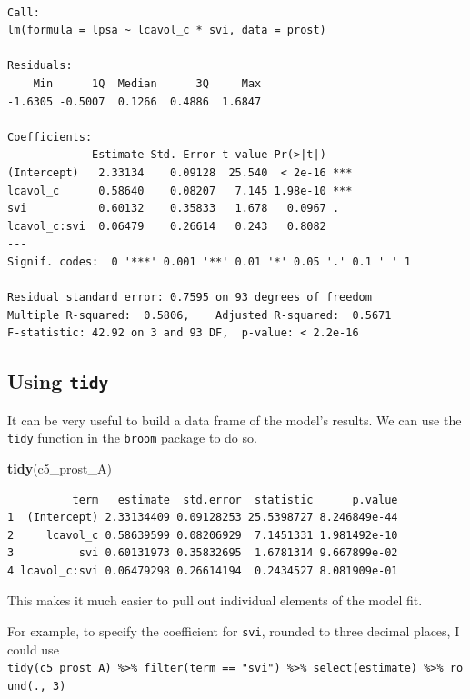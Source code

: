 \documentclass[]{book}
\newenvironment{Shaded}{\begin{snugshade}}{\end{snugshade}}
\newcommand{\KeywordTok}[1]{\textcolor[rgb]{0.13,0.29,0.53}{\textbf{#1}}}
\newcommand{\NormalTok}[1]{#1}
\theoremstyle{definition}
\theoremstyle{definition}
\theoremstyle{definition}
\theoremstyle{remark}
\begin{document}
\begin{verbatim}

Call:
lm(formula = lpsa ~ lcavol_c * svi, data = prost)

Residuals:
    Min      1Q  Median      3Q     Max 
-1.6305 -0.5007  0.1266  0.4886  1.6847 

Coefficients:
             Estimate Std. Error t value Pr(>|t|)    
(Intercept)   2.33134    0.09128  25.540  < 2e-16 ***
lcavol_c      0.58640    0.08207   7.145 1.98e-10 ***
svi           0.60132    0.35833   1.678   0.0967 .  
lcavol_c:svi  0.06479    0.26614   0.243   0.8082    
---
Signif. codes:  0 '***' 0.001 '**' 0.01 '*' 0.05 '.' 0.1 ' ' 1

Residual standard error: 0.7595 on 93 degrees of freedom
Multiple R-squared:  0.5806,    Adjusted R-squared:  0.5671 
F-statistic: 42.92 on 3 and 93 DF,  p-value: < 2.2e-16
\end{verbatim}

\subsection{\texorpdfstring{Using
\texttt{tidy}}{Using tidy}}\label{using-tidy}

It can be very useful to build a data frame of the model's results. We
can use the \texttt{tidy} function in the \texttt{broom} package to do
so.

\begin{Shaded}
\begin{Highlighting}[]
\KeywordTok{tidy}\NormalTok{(c5_prost_A)}
\end{Highlighting}
\end{Shaded}

\begin{verbatim}
          term   estimate  std.error  statistic      p.value
1  (Intercept) 2.33134409 0.09128253 25.5398727 8.246849e-44
2     lcavol_c 0.58639599 0.08206929  7.1451331 1.981492e-10
3          svi 0.60131973 0.35832695  1.6781314 9.667899e-02
4 lcavol_c:svi 0.06479298 0.26614194  0.2434527 8.081909e-01
\end{verbatim}

This makes it much easier to pull out individual elements of the model
fit.

For example, to specify the coefficient for \texttt{svi}, rounded to
three decimal places, I could use
\texttt{tidy(c5\_prost\_A)\ \%\textgreater{}\%\ filter(term\ ==\ "svi")\ \%\textgreater{}\%\ select(estimate)\ \%\textgreater{}\%\ round(.,\ 3)}
\end{document}
